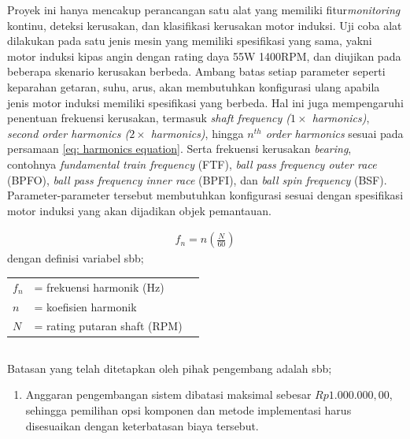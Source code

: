 \documentclass{elsinta}
\begin{document}
Proyek ini hanya mencakup perancangan satu alat yang memiliki
fitur\textit{monitoring} kontinu, deteksi kerusakan, dan klasifikasi kerusakan motor induksi.
Uji coba alat dilakukan pada
satu jenis mesin yang memiliki spesifikasi yang sama, yakni
motor induksi kipas angin dengan rating daya 55W 1400RPM, dan diujikan pada beberapa
skenario kerusakan berbeda. Ambang batas setiap parameter seperti
keparahan getaran, suhu, arus, akan membutuhkan konfigurasi ulang
apabila jenis motor induksi memiliki spesifikasi yang berbeda.
Hal ini juga mempengaruhi penentuan frekuensi kerusakan, termasuk \textit{shaft frequency
($1\times$ harmonics)}, \textit{second order harmonics ($2\times$ harmonics)}, hingga
\textit{$n^{th}$ order harmonics} sesuai pada persamaan \ref{eq: harmonics equation}.%
Serta frekuensi kerusakan \textit{bearing}, contohnya \textit{fundamental train frequency} (FTF),
\textit{ball pass frequency outer race} (BPFO), \textit{ball pass frequency inner race} (BPFI),
dan \textit{ball spin frequency} (BSF). Parameter-parameter tersebut
membutuhkan konfigurasi sesuai dengan spesifikasi motor induksi yang akan dijadikan objek pemantauan.

\begin{align}
    \label{eq: harmonics equation}
    f_n = n (\frac{N}{60})
\end{align}
dengan definisi variabel sbb;

\begin{tabular}{lll}
    $f_n$ & = frekuensi harmonik (Hz) \\
    $n$   & = koefisien harmonik \\
    $N$   & = rating putaran shaft (RPM) \\
\end{tabular}


\subsection{\ConstraintsTitle}

Batasan yang telah ditetapkan oleh pihak pengembang adalah sbb;
\begin{enumerate}
    \item   Anggaran pengembangan sistem dibatasi maksimal 
            sebesar $Rp 1.000.000,00$, sehingga pemilihan
            opsi komponen dan metode implementasi harus
            disesuaikan dengan keterbatasan biaya tersebut.
\end{enumerate}
\end{document}
